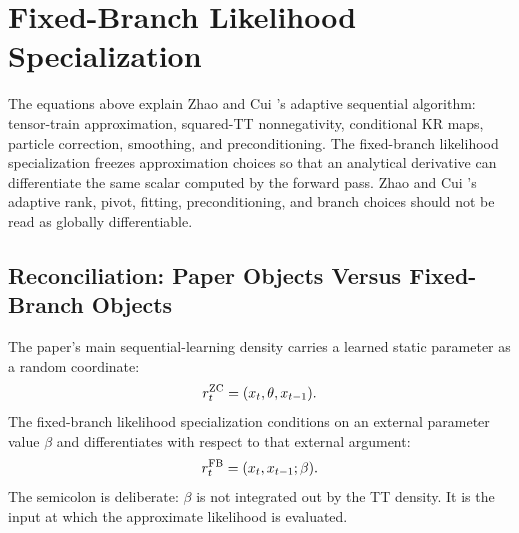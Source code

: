 \documentclass[11pt]{article}
\numberwithin{equation}{section}
\begin{document}
\begin{center}
\end{center}

\section{Fixed-Branch Likelihood Specialization}

The equations above explain Zhao and Cui \cite{zhao2024ttsequential}'s adaptive
sequential algorithm: tensor-train approximation, squared-TT nonnegativity,
conditional KR maps, particle correction, smoothing, and preconditioning.  The
fixed-branch likelihood specialization freezes approximation choices so that
an analytical derivative can differentiate the same scalar computed by the
forward pass.  Zhao and Cui \cite{zhao2024ttsequential}'s adaptive rank, pivot,
fitting, preconditioning, and branch choices should not be read as globally
differentiable.

\subsection*{Reconciliation: Paper Objects Versus Fixed-Branch Objects}

The paper's main sequential-learning density carries a learned static
parameter as a random coordinate:
\begin{equation}
    r_t^{\rm ZC}=(x_t,\theta,x_{t-1}).
    \label{eq:p24-r1}
\end{equation}
The fixed-branch likelihood specialization conditions on an external parameter value
\(\beta\) and differentiates with respect to that external argument:
\begin{equation}
    r_t^{\rm FB}=(x_t,x_{t-1};\beta).
    \label{eq:p24-r2}
\end{equation}
The semicolon is deliberate: \(\beta\) is not integrated out by the TT density.
It is the input at which the approximate likelihood is evaluated.
\end{document}
